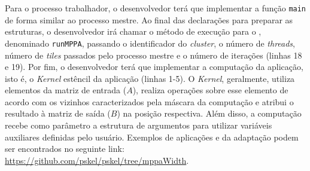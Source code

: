 Para o processo trabalhador, o desenvolvedor terá que implementar a função \texttt{main}
de forma similar ao processo mestre. Ao final das declarações para preparar as
estruturas, o desenvolvedor irá chamar o método de execução para o \mppa,
denominado \texttt{runMPPA}, passando o identificador do \textit{cluster}, o número de \textit{threads},
número de \textit{tiles} passados pelo processo mestre e o número de iterações
(linhas 18 e 19).
Por fim, o desenvolvedor terá que implementar a computação da aplicação, isto é,
o \textit{Kernel} estêncil da aplicação (linhas 1-5). O \textit{Kernel}, geralmente, utiliza
elementos da matriz de entrada ($A$), realiza operações sobre esse elemento de
acordo com os vizinhos caracterizados pela máscara da computação e atribui o
resultado à matriz de saída ($B$) na posição respectiva. Além disso, a computação
recebe como parâmetro a estrutura de argumentos para utilizar variáveis
auxiliares definidas pelo usuário. Exemplos de aplicações e da
adaptação podem ser encontrados no seguinte link:
\url{https://github.com/pskel/pskel/tree/mppaWidth}.





